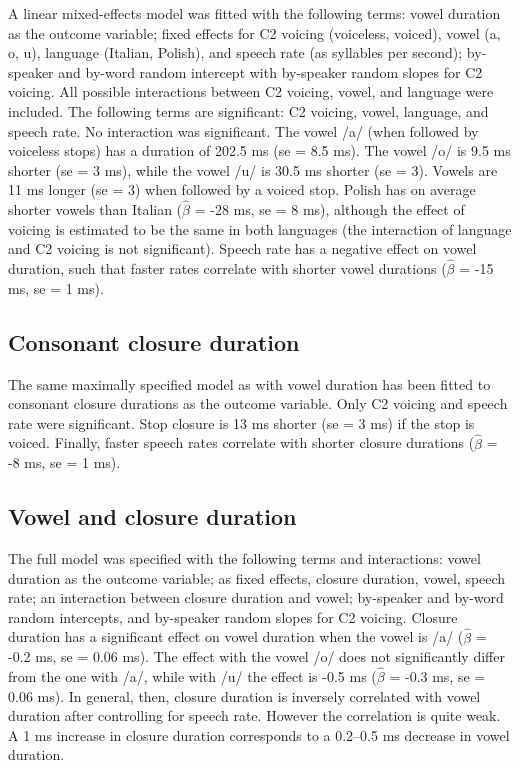 \documentclass[]{JASAnew}
\begin{document}
A linear mixed-effects model was fitted with the following terms: vowel
duration as the outcome variable; fixed effects for C2 voicing
(voiceless, voiced), vowel (a, o, u), language (Italian, Polish), and
speech rate (as syllables per second); by-speaker and by-word random
intercept with by-speaker random slopes for C2 voicing. All possible
interactions between C2 voicing, vowel, and language were included. The
following terms are significant: C2 voicing, vowel, language, and speech
rate. No interaction was significant. The vowel /a/ (when followed by
voiceless stops) has a duration of 202.5 ms (se = 8.5 ms). The vowel /o/
is 9.5 ms shorter (se = 3 ms), while the vowel /u/ is 30.5 ms shorter
(se = 3). Vowels are 11 ms longer (se = 3) when followed by a voiced
stop. Polish has on average shorter vowels than Italian (\(\hat{\beta}\)
= -28 ms, se = 8 ms), although the effect of voicing is estimated to be
the same in both languages (the interaction of language and C2 voicing
is not significant). Speech rate has a negative effect on vowel
duration, such that faster rates correlate with shorter vowel durations
(\(\hat{\beta}\) = -15 ms, se = 1 ms).

\hypertarget{consonant-closure-duration}{%
\subsection{Consonant closure
duration}\label{consonant-closure-duration}}

The same maximally specified model as with vowel duration has been
fitted to consonant closure durations as the outcome variable. Only C2
voicing and speech rate were significant. Stop closure is 13 ms shorter
(se = 3 ms) if the stop is voiced. Finally, faster speech rates
correlate with shorter closure durations (\(\hat{\beta}\) = -8 ms, se =
1 ms).

\hypertarget{vowel-and-closure-duration}{%
\subsection{Vowel and closure
duration}\label{vowel-and-closure-duration}}

The full model was specified with the following terms and interactions:
vowel duration as the outcome variable; as fixed effects, closure
duration, vowel, speech rate; an interaction between closure duration
and vowel; by-speaker and by-word random intercepts, and by-speaker
random slopes for C2 voicing. Closure duration has a significant effect
on vowel duration when the vowel is /a/ (\(\hat{\beta}\) = -0.2 ms, se =
0.06 ms). The effect with the vowel /o/ does not significantly differ
from the one with /a/, while with /u/ the effect is -0.5 ms
(\(\hat{\beta}\) = -0.3 ms, se = 0.06 ms). In general, then, closure
duration is inversely correlated with vowel duration after controlling
for speech rate. However the correlation is quite weak. A 1 ms increase
in closure duration corresponds to a 0.2--0.5 ms decrease in vowel
duration.
\end{document}
